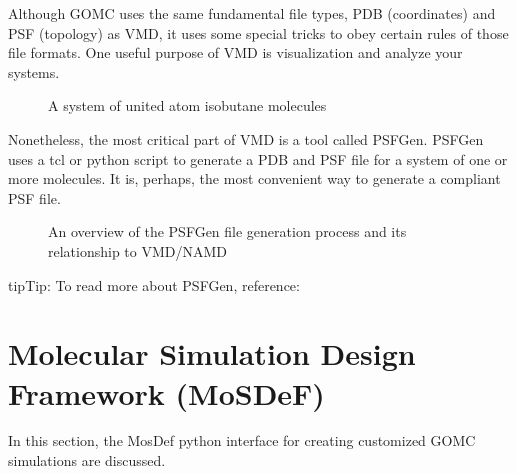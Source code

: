 \documentclass[letterpaper,10pt,english]{sphinxmanual}
\begin{document}
\sphinxAtStartPar
{}

\sphinxAtStartPar
Although GOMC uses the same fundamental file types, PDB (coordinates) and PSF (topology) as VMD, it uses some special tricks to obey certain rules of those file formats. One useful purpose of VMD is visualization and analyze your systems.

\begin{figure}[htbp]
\centering
\capstart

\noindent{}
\caption{A system of united atom isobutane molecules}\label{\detokenize{software_tools:id1}}\end{figure}

\sphinxAtStartPar
Nonetheless, the most critical part of VMD is a tool called PSFGen. PSFGen uses a tcl or python script to generate a PDB and PSF file for a system of one or more molecules. It is, perhaps, the most convenient way to generate a compliant PSF file.

\begin{figure}[htbp]
\centering
\capstart

\noindent{}
\caption{An overview of the PSFGen file generation process and its relationship to VMD/NAMD}\label{\detokenize{software_tools:id2}}\end{figure}

\begin{sphinxadmonition}{tip}{Tip:}
\sphinxAtStartPar
To read more about PSFGen, reference:

\sphinxAtStartPar
{}

\sphinxAtStartPar
{}

\sphinxAtStartPar
{}
\end{sphinxadmonition}


\section{Molecular Simulation Design Framework (MoSDeF)}
\label{\detokenize{software_tools:molecular-simulation-design-framework-mosdef}}
\sphinxAtStartPar
In this section, the MosDef python interface for creating customized GOMC simulations are discussed.
\end{document}
